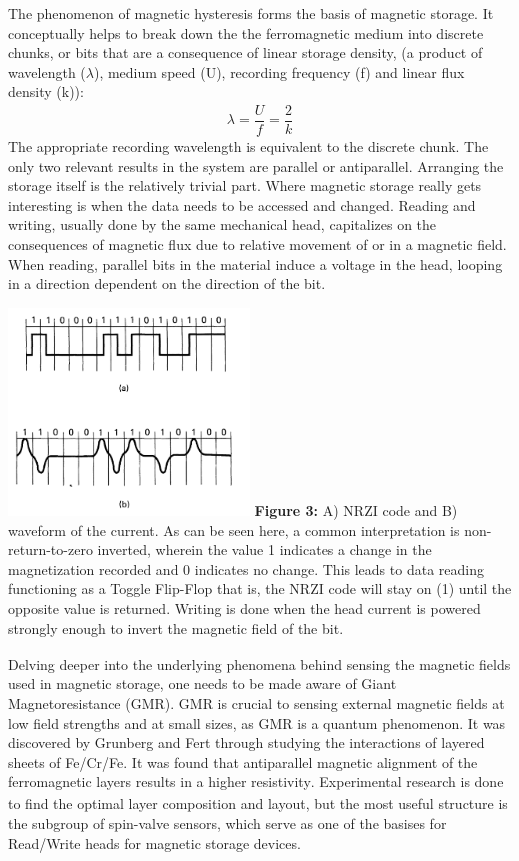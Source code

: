 \documentclass[11pt]{article}
\begin{document}
\begin{multicols}{2}
The phenomenon of magnetic hysteresis forms the basis of magnetic storage. It conceptually helps to break down the the ferromagnetic medium into discrete chunks, or bits that are a consequence of linear storage density, (a product of wavelength ($\lambda$), medium speed (U), recording frequency (f) and linear flux density (k)):
\begin{align*}
	\lambda= \dfrac{U}{f} = \dfrac{2}{k}
\end{align*}
The appropriate recording wavelength is equivalent to the discrete chunk. The only two relevant results in the system are parallel or antiparallel. Arranging the storage itself is the relatively trivial part. Where magnetic storage really gets interesting is when the data needs to be accessed and changed. Reading and writing, usually done by the same mechanical head, capitalizes on the consequences of magnetic flux due to relative movement of or in a magnetic field. When reading, parallel bits in the material induce a voltage in the head, looping in a direction dependent on the direction of the bit. 
\begin{center}
	\centering
	\includegraphics[width=0.48\textwidth]{Waveform_code.png}
	{\footnotesize\textbf{Figure 3:}  A) NRZI code and B) waveform of the current. As can be seen here, a common interpretation is non-return-to-zero inverted, wherein the value 1 indicates a change in the magnetization recorded and 0 indicates no change. This leads to data reading functioning as a Toggle Flip-Flop that is, the NRZI code will stay on (1) until the opposite value is returned. Writing is done when the head current is powered strongly enough to invert the magnetic field of the bit\textsubscript{\cite{label1}}}.
\end{center} 




Delving deeper into the underlying phenomena behind sensing the magnetic fields used in magnetic storage, one needs to be made aware of Giant Magnetoresistance (GMR). GMR is crucial to sensing external magnetic fields at low field strengths and at small sizes, as GMR is a quantum phenomenon. It was discovered by Grunberg and Fert through studying the interactions of layered sheets of Fe/Cr/Fe. It was found that antiparallel magnetic alignment of the ferromagnetic layers results in a higher resistivity\textsubscript{\cite{label5}}. Experimental research is done to find the optimal layer composition and layout, but the most useful structure is the subgroup of spin-valve sensors, which serve as one of the basises for Read/Write heads for magnetic storage devices.


\end{multicols}
\end{document}
